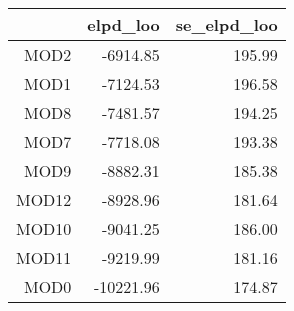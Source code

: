 \begin{table}[ht]
\centering
\begin{tabular}{rrr}
  \hline
 & elpd\_loo & se\_elpd\_loo \\ 
  \hline
MOD2 & -6914.85 & 195.99 \\ 
  MOD1 & -7124.53 & 196.58 \\ 
  MOD8 & -7481.57 & 194.25 \\ 
  MOD7 & -7718.08 & 193.38 \\ 
  MOD9 & -8882.31 & 185.38 \\ 
  MOD12 & -8928.96 & 181.64 \\ 
  MOD10 & -9041.25 & 186.00 \\ 
  MOD11 & -9219.99 & 181.16 \\ 
  MOD0 & -10221.96 & 174.87 \\ 
   \hline
\end{tabular}
\end{table}
